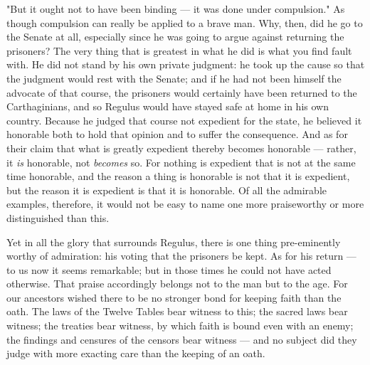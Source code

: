  "But it ought not to have been binding — it was done under compulsion." As though compulsion can really be applied to a brave man. Why, then, did he go to the Senate at all, especially since he was going to argue against returning the prisoners? The very thing that is greatest in what he did is what you find fault with. He did not stand by his own private judgment: he took up the cause so that the judgment would rest with the Senate; and if he had not been himself the advocate of that course, the prisoners would certainly have been returned to the Carthaginians, and so Regulus would have stayed safe at home in his own country. Because he judged that course not expedient for the state, he believed it honorable both to hold that opinion and to suffer the consequence. And as for their claim that what is greatly expedient thereby becomes honorable — rather, it \textit{is} honorable, not \textit{becomes} so. For nothing is expedient that is not at the same time honorable, and the reason a thing is honorable is not that it is expedient, but the reason it is expedient is that it is honorable. Of all the admirable examples, therefore, it would not be easy to name one more praiseworthy or more distinguished than this.

 Yet in all the glory that surrounds Regulus, there is one thing pre-eminently worthy of admiration: his voting that the prisoners be kept. As for his return — to us now it seems remarkable; but in those times he could not have acted otherwise. That praise accordingly belongs not to the man but to the age. For our ancestors wished there to be no stronger bond for keeping faith than the oath. The laws of the Twelve Tables bear witness to this; the sacred laws bear witness; the treaties bear witness, by which faith is bound even with an enemy; the findings and censures of the censors bear witness — and no subject did they judge with more exacting care than the keeping of an oath.

